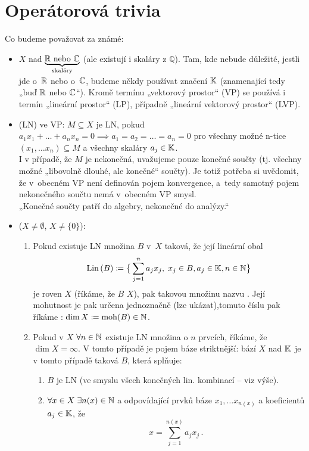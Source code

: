 \section{Operátorová trivia}

Co budeme považovat za známé:
\begin{itemize}
    \item {} $X$ nad
    $\underbrace{\mathbb{R}\text{ nebo }\mathbb{C}}_{\text{skaláry}}$ (ale existují i skaláry z $\mathbb{Q}$). Tam, kde nebude důležité, jestli jde o~$\mathbb{R}$ nebo o~$\mathbb{C}$, budeme někdy používat značení $\mathbb{K}$ (znamenající tedy „buď $\mathbb{R}$ nebo $\mathbb{C}$“). Kromě termínu „vektorový prostor“ (VP) se používá i termín „lineární prostor“ (LP), případně „lineární vektorový prostor“ (LVP).
    
    \item {} (LN)  ve VP: $M \subseteq X$ je LN, pokud $a_1 x_1 + \dots + a_n x_n = 0 \implies a_1 = a_2 = \dots = a_n = 0$ pro všechny možné n-tice $(x_1, \dots x_n) \subseteq M$ a všechny skaláry $a_j \in \mathbb{K}$.
    \\[5pt]
    \Poznamka I v případě, že $M$ je nekonečná, uvažujeme pouze konečné součty (tj. všechny možné „libovolně dlouhé, ale konečné“ součty). Je totiž potřeba si uvědomit, že v~obecném VP není definován pojem konvergence, a~tedy samotný pojem nekonečného součtu nemá v~obecném VP smysl.
    \\[5pt]
    „Konečné součty patří do algebry, nekonečné do analýzy.“
    
    \item {} ($X \neq \emptyset$, $X \neq \{0\}$):
    \begin{enumerate}
        \item Pokud existuje  LN množina $B$ v~$X$ taková, že její lineární obal
        $$ \operatorname{Lin}\,(B) \coloneqq \big\{ \sum_{j=1}^n a_j x_j, \;  x_j \in B, a_j \in \mathbb{K}, n \in \mathbb{N} \big\} $$
        je roven $X$ (říkáme, že $B$  $X$), pak takovou množinu nazvu .
        Její mohutnost je pak určena jednoznačně (lze ukázat),tomuto číslu pak říkáme : $\dim X \coloneqq \operatorname{moh}(B) \in \mathbb{N}$.
        \item Pokud v $X$ $\forall n \in \mathbb{N}$ existuje LN množina o $n$ prvcích, říkáme, že $\dim X = \infty$. V tomto případě je pojem báze striktnější: bází $X$ nad $\mathbb{K}$ je v tomto případě taková  $B$, která splňuje:
        \begin{enumerate}
            \item $B$ je LN (ve smyslu všech konečných lin. kombinací – viz výše).
            \item $\forall x \in X \; \exists n(x) \in \mathbb{N}$ a odpovídající  prvků báze $x_1, \dots x_{n(x)}$ a koeficientů $a_j \in \mathbb{K}$, že
            $$ x = \sum_{j=1}^{n(x)} a_j x_j \,. $$
        \end{enumerate}
        

\end{enumerate}
\end{itemize}
